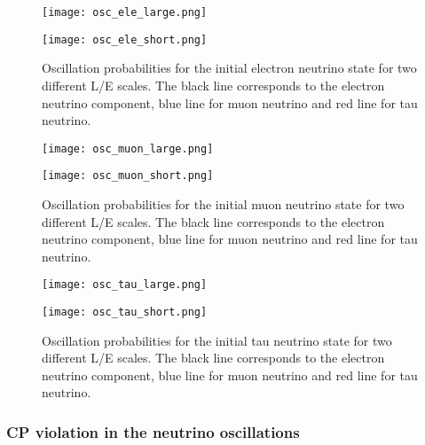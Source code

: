 \documentclass[../main.tex]{subfiles}
\begin{document}
\begin{figure}[!ht]
\centering
\begin{minipage}{0.4\linewidth}
  \centering
  \texttt{[image: osc\_ele\_large.png]}
\end{minipage}
\hfill
\begin{minipage}{0.4\linewidth}
  \centering
  \texttt{[image: osc\_ele\_short.png]}
\end{minipage}
\caption{Oscillation probabilities for the initial electron neutrino state for two different L/E scales. The black line corresponds to the electron neutrino component, blue line for muon neutrino and red line for tau neutrino.}
\label{fig:intro:osc1}
\end{figure}

\begin{figure}
\centering
\begin{minipage}{0.4\linewidth}
  \texttt{[image: osc\_muon\_large.png]}
\end{minipage}
\hfill
\begin{minipage}{0.4\linewidth}
  \texttt{[image: osc\_muon\_short.png]}
\end{minipage}
\caption{Oscillation probabilities for the initial muon neutrino state for two different L/E scales. The black line corresponds to the electron neutrino component, blue line for muon neutrino and red line for tau neutrino.}
\label{fig:intro:osc2}
\end{figure}

\begin{figure}
\centering
\begin{minipage}{0.4\linewidth}
  \texttt{[image: osc\_tau\_large.png]}
\end{minipage}
\hfill
\begin{minipage}{0.4\linewidth}
  \texttt{[image: osc\_tau\_short.png]}
\end{minipage}
\caption{Oscillation probabilities for the initial tau neutrino state for two different L/E scales. The black line corresponds to the electron neutrino component, blue line for muon neutrino and red line for tau neutrino.}
\label{fig:intro:osc3}
\end{figure}

\subsubsection{CP violation in the neutrino oscillations}
\end{document}
